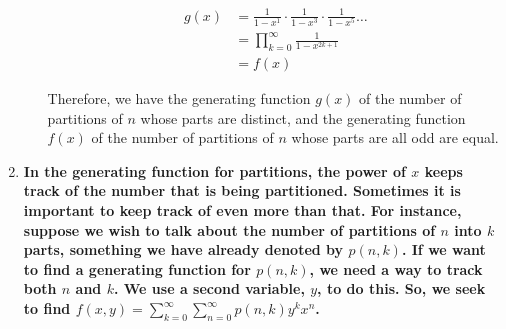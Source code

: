 \documentclass[10pt]{article}
\newcommand{\ds}{\displaystyle}
\begin{document}
\begin{enumerate}
\begin{enumerate}
\begin{align*}
    g(x)
    &= \frac{1}{1-x^1} \cdot \frac{1}{1-x^3} \cdot \frac{1}{1-x^5}  \ldots \\
    &=  \prod\limits^{\infty}_{k=0} \frac{1}{1-x^{2k+1}}\\
    &= f(x)
\end{align*}

Therefore, we have the generating function $g(x)$ of the number of partitions of $n$ whose parts are distinct, and the generating function $f(x)$ of the number of partitions of $n$ whose parts are all odd are equal. 

\end{enumerate}
 
\vskip 1cm

 
 
\item
\textbf{In the generating function for partitions, the power of $x$ keeps track of the number that is being partitioned. Sometimes it is important to keep track of even more than that. For instance, suppose we wish to talk about the number of partitions of $n$ into $k$ parts, something we have already denoted by $p(n, k)$. If we want to find a generating function for $p(n, k)$, we need a way to track both $n$ and $k$. We use a second variable, $y$, to do this.  So, we seek to find $f(x,y) = \ds\sum\limits_{k=0}^{\infty}\sum\limits_{n=0}^{\infty} p(n,k)y^kx^n$.}
 
\end{enumerate}
\end{document}
